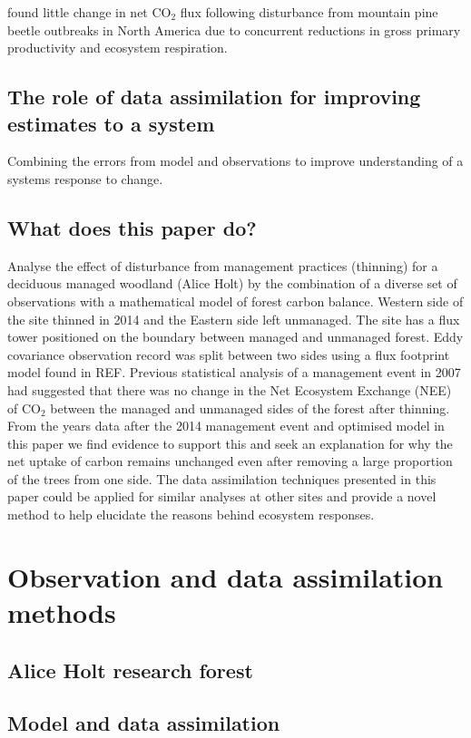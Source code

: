 \documentclass[11pt]{article}
\begin{document}
\citet{ELE:ELE12097} found little change in net CO\(_{2}\) flux following disturbance from mountain pine beetle outbreaks in North America due to concurrent reductions in gross primary productivity and ecosystem respiration.

\subsection{The role of data assimilation for improving estimates to a system}
Combining the errors from model and observations to improve understanding of a systems response to change.

\subsection{What does this paper do?}
Analyse the effect of disturbance from management practices (thinning) for a deciduous managed woodland (Alice Holt) by the combination of a diverse set of observations with a mathematical model of forest carbon balance. Western side of the site thinned in 2014 and the Eastern side left unmanaged. The site has a flux tower positioned on the boundary between managed and unmanaged forest. Eddy covariance observation record was split between two sides using a flux footprint model found in REF. Previous statistical analysis of a management event in 2007 had suggested that there was no change in the Net Ecosystem Exchange (NEE) of CO\(_{2}\) between the managed and unmanaged sides of the forest after thinning. From the years data after the 2014 management event and optimised model in this paper we find evidence to support this and seek an explanation for why the net uptake of carbon remains unchanged even after removing a large proportion of the trees from one side. The data assimilation techniques presented in this paper could be applied for similar analyses at other sites and provide a novel method to help elucidate the reasons behind ecosystem responses.   

\section{Observation and data assimilation methods}
\subsection{Alice Holt research forest}

\subsection{Model and data assimilation}
\end{document}
